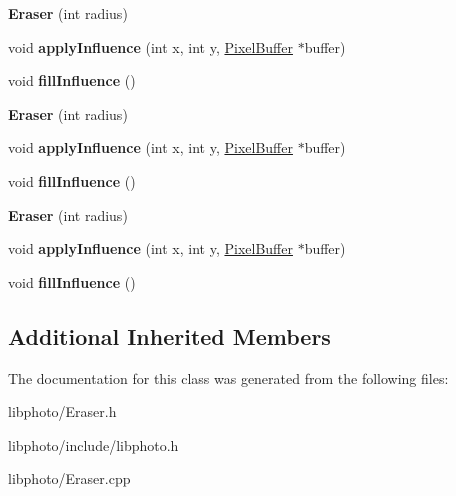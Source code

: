 \begin{DoxyCompactItemize}
\item 
\hypertarget{classEraser_a60abccb4522452a4cdfb714eafbc9c16}{{\bfseries Eraser} (int radius)}\label{classEraser_a60abccb4522452a4cdfb714eafbc9c16}

\item 
\hypertarget{classEraser_a195eeec6843317ee33e0e51fccb3daff}{void {\bfseries apply\-Influence} (int x, int y, \hyperlink{classPixelBuffer}{Pixel\-Buffer} $\ast$buffer)}\label{classEraser_a195eeec6843317ee33e0e51fccb3daff}

\item 
\hypertarget{classEraser_ad718ebd5796e0a83dbd94aa4f0ce2921}{void {\bfseries fill\-Influence} ()}\label{classEraser_ad718ebd5796e0a83dbd94aa4f0ce2921}

\item 
\hypertarget{classEraser_a60abccb4522452a4cdfb714eafbc9c16}{{\bfseries Eraser} (int radius)}\label{classEraser_a60abccb4522452a4cdfb714eafbc9c16}

\item 
\hypertarget{classEraser_a195eeec6843317ee33e0e51fccb3daff}{void {\bfseries apply\-Influence} (int x, int y, \hyperlink{classPixelBuffer}{Pixel\-Buffer} $\ast$buffer)}\label{classEraser_a195eeec6843317ee33e0e51fccb3daff}

\item 
\hypertarget{classEraser_ad718ebd5796e0a83dbd94aa4f0ce2921}{void {\bfseries fill\-Influence} ()}\label{classEraser_ad718ebd5796e0a83dbd94aa4f0ce2921}

\item 
\hypertarget{classEraser_a60abccb4522452a4cdfb714eafbc9c16}{{\bfseries Eraser} (int radius)}\label{classEraser_a60abccb4522452a4cdfb714eafbc9c16}

\item 
\hypertarget{classEraser_a195eeec6843317ee33e0e51fccb3daff}{void {\bfseries apply\-Influence} (int x, int y, \hyperlink{classPixelBuffer}{Pixel\-Buffer} $\ast$buffer)}\label{classEraser_a195eeec6843317ee33e0e51fccb3daff}

\item 
\hypertarget{classEraser_ad718ebd5796e0a83dbd94aa4f0ce2921}{void {\bfseries fill\-Influence} ()}\label{classEraser_ad718ebd5796e0a83dbd94aa4f0ce2921}

\end{DoxyCompactItemize}
\subsection*{Additional Inherited Members}


The documentation for this class was generated from the following files\-:\begin{DoxyCompactItemize}
\item 
libphoto/Eraser.\-h\item 
libphoto/include/libphoto.\-h\item 
libphoto/Eraser.\-cpp\end{DoxyCompactItemize}
